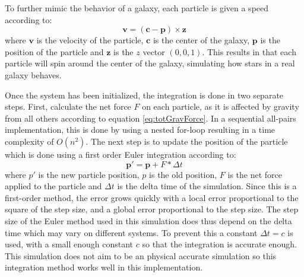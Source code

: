 To further mimic the behavior of a galaxy, each particle is given a speed according to:
\begin{equation}
    \boldsymbol v = (\boldsymbol c - \boldsymbol p) \times  \boldsymbol z
\end{equation}
\noindent where $\boldsymbol v$ is the velocity of the particle, $\boldsymbol c$ is the center of the galaxy, $\boldsymbol p$ is the position of the particle and $\boldsymbol z$ is the $z$ vector $(0, 0, 1)$. This results in that each particle will spin around the center of the galaxy, simulating how stars in a real galaxy behaves.

Once the system has been initialized, the integration is done in two separate steps. First, calculate the net force $F$ on each particle, as it is affected by gravity from all others according to equation \ref{eq:totGravForce}. In a sequential all-pairs implementation, this is done by using a nested for-loop resulting in a time complexity of $O(n^2)$. The next step is to update the position of the particle which is done using a first order Euler integration according to:
\begin{equation} \label{eq:EulerIntegrationPosition}
    \boldsymbol p' = \boldsymbol p + F * \Delta t
\end{equation}
\noindent where $p'$ is the new particle position, $p$ is the old position, $F$ is the net force applied to the particle and $\Delta t$ is the delta time of the simulation.
Since this is a first-order method, the error grows quickly with a local error proportional to the square of the step size, and a global error proportional to the step size. The step size of the Euler method used in this simulation does thus depend on the delta time which may vary on different systems. To prevent this a constant $\Delta t = c$ is used, with a small enough constant $c$ so that the integration is accurate enough. This simulation does not aim to be an physical accurate simulation so this integration method works well in this implementation.



